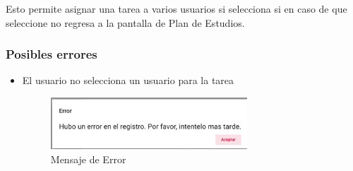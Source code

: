        Esto permite asignar una tarea a varios usuarios si selecciona si en caso de que seleccione no regresa a la pantalla de Plan de Estudios.

            \subsubsection{Posibles errores}

                \begin{itemize}
                    \item El usuario no selecciona un usuario para la tarea
                    \begin{figure}[H]
                    \centering
                    \hypertarget{error}{\includegraphics[width=0.7\linewidth]{images/Tareas/Error}}
                    \caption{Mensaje de Error}
                    \label{error}
                    \end{figure}
                \end{itemize}

